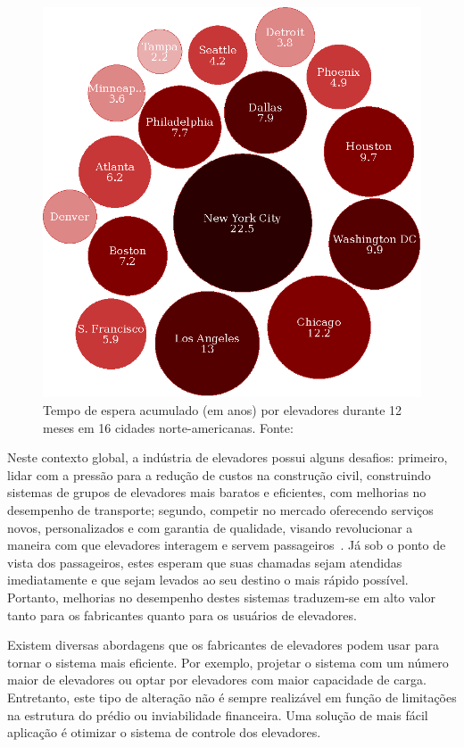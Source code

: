 \begin{figure}[htb!]
\centering\includegraphics{img/time-cost.eps}
\caption{\label{fig:timecost}Tempo de espera acumulado (em anos) por elevadores
durante 12 meses em 16 cidades norte-americanas. Fonte:~\cite{IBM10}}
\end{figure}

Neste contexto global, a indústria de elevadores possui alguns desafios:
primeiro, lidar com a pressão para a redução de custos na construção civil,
construindo sistemas de grupos de elevadores mais baratos e eficientes, com
melhorias no desempenho de transporte; segundo, competir no mercado oferecendo
serviços novos, personalizados e com garantia de qualidade, visando revolucionar
a maneira com que elevadores interagem e servem
passageiros~\cite{KOEHLEROTTIGER02}. Já sob o ponto de vista dos passageiros,
estes esperam que suas chamadas sejam atendidas imediatamente e que sejam
levados ao seu destino o mais rápido possível. Portanto, melhorias no desempenho
destes sistemas traduzem-se em alto valor tanto para os fabricantes quanto para
os usuários de elevadores.

Existem diversas abordagens que os fabricantes de elevadores podem usar para
tornar o sistema mais eficiente. Por exemplo, projetar o sistema com um número
maior de elevadores ou optar por elevadores com maior capacidade de carga.
Entretanto, este tipo de alteração não é sempre realizável em função de
limitações na estrutura do prédio ou inviabilidade financeira. Uma solução de
mais fácil aplicação é otimizar o sistema de controle dos elevadores.

